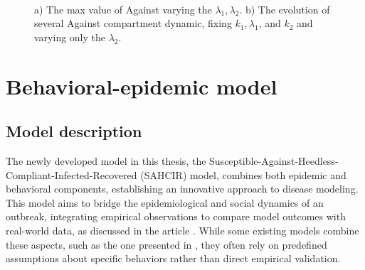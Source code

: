 \begin{figure}[h]
	\centering
	 \quad
	 \\
		\caption[Max against first case]{a) The max value of Against varying the $\lambda_1, \lambda_2$. b) The evolution of several Against compartment dynamic, fixing $k_1, \lambda_1$, and $k_2$ and varying only the $\lambda_2$.}
	\label{fig:max_against2}
\end{figure}

\chapter{Behavioral-epidemic model}
\label{ch:epi_behav_model}
\section{Model description}

The newly developed model in this thesis, the Susceptible-Against-Heedless-Compliant-Infected-Recovered (SAHCIR) model, combines both epidemic and behavioral components, establishing an innovative approach to disease modeling. This model aims to bridge the epidemiological and social dynamics of an outbreak, integrating empirical observations to compare model outcomes with real-world data, as discussed in the article \cite{Proverbio_Tex_2024}. While some existing models combine these aspects, such as the one presented in \cite{Bulai2023}, they often rely on predefined assumptions about specific behaviors rather than direct empirical validation.

